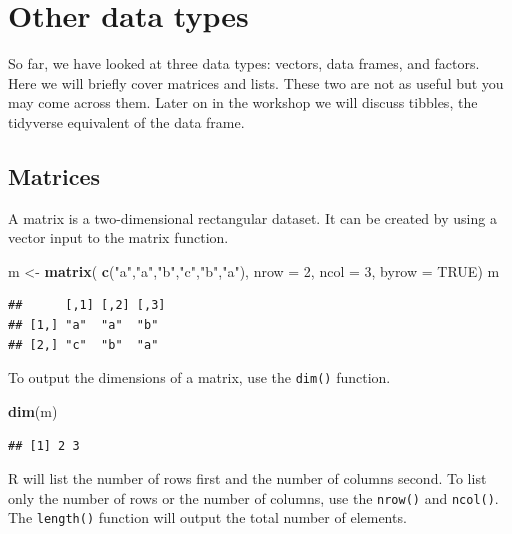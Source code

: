 \documentclass[
]{book}
\newenvironment{Shaded}{\begin{snugshade}}{\end{snugshade}}
\newcommand{\AttributeTok}[1]{\textcolor[rgb]{0.13,0.29,0.53}{#1}}
\newcommand{\ConstantTok}[1]{\textcolor[rgb]{0.56,0.35,0.01}{#1}}
\newcommand{\DecValTok}[1]{\textcolor[rgb]{0.00,0.00,0.81}{#1}}
\newcommand{\FunctionTok}[1]{\textcolor[rgb]{0.13,0.29,0.53}{\textbf{#1}}}
\newcommand{\NormalTok}[1]{#1}
\newcommand{\OtherTok}[1]{\textcolor[rgb]{0.56,0.35,0.01}{#1}}
\newcommand{\StringTok}[1]{\textcolor[rgb]{0.31,0.60,0.02}{#1}}
\begin{document}
\section{Other data types}\label{other-data-types}

So far, we have looked at three data types: vectors, data frames, and factors. Here we will briefly cover matrices and lists. These two are not as useful but you may come across them. Later on in the workshop we will discuss tibbles, the tidyverse equivalent of the data frame.

\subsection*{Matrices}\label{matrices}

A matrix is a two-dimensional rectangular dataset. It can be created by using a vector input to the matrix function.

\begin{Shaded}
\begin{Highlighting}[]
\NormalTok{m }\OtherTok{\textless{}{-}} \FunctionTok{matrix}\NormalTok{( }\FunctionTok{c}\NormalTok{(}\StringTok{"a"}\NormalTok{,}\StringTok{"a"}\NormalTok{,}\StringTok{"b"}\NormalTok{,}\StringTok{"c"}\NormalTok{,}\StringTok{"b"}\NormalTok{,}\StringTok{"a"}\NormalTok{), }\AttributeTok{nrow =} \DecValTok{2}\NormalTok{, }\AttributeTok{ncol =} \DecValTok{3}\NormalTok{, }\AttributeTok{byrow =} \ConstantTok{TRUE}\NormalTok{)}
\NormalTok{m}
\end{Highlighting}
\end{Shaded}

\begin{verbatim}
##      [,1] [,2] [,3]
## [1,] "a"  "a"  "b" 
## [2,] "c"  "b"  "a"
\end{verbatim}

To output the dimensions of a matrix, use the \texttt{dim()} function.

\begin{Shaded}
\begin{Highlighting}[]
\FunctionTok{dim}\NormalTok{(m) }
\end{Highlighting}
\end{Shaded}

\begin{verbatim}
## [1] 2 3
\end{verbatim}

R will list the number of rows first and the number of columns second. To list only the number of rows or the number of columns, use the \texttt{nrow()} and \texttt{ncol()}. The \texttt{length()} function will output the total number of elements.
\end{document}
